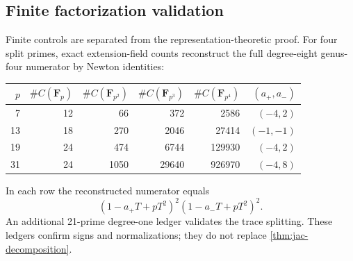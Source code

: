 \subsection{Finite factorization validation}

Finite controls are separated from the representation-theoretic proof.
For four split primes, exact extension-field counts reconstruct the full
degree-eight genus-four numerator by Newton identities:

\begin{center}
\begin{tabular}{@{}rrrrrr@{}}
\toprule
\(p\) & \(\#C(\mathbf F_p)\) & \(\#C(\mathbf F_{p^2})\) &
\(\#C(\mathbf F_{p^3})\) & \(\#C(\mathbf F_{p^4})\) &
\((a_+,a_-)\)\\
\midrule
7  & 12 & 66   & 372   & 2586   & \((-4,2)\)\\
13 & 18 & 270  & 2046  & 27414  & \((-1,-1)\)\\
19 & 24 & 474  & 6744  & 129930 & \((-4,2)\)\\
31 & 24 & 1050 & 29640 & 926970 & \((-4,8)\)\\
\bottomrule
\end{tabular}
\end{center}

In each row the reconstructed numerator equals
\[
 (1-a_+T+pT^2)^2(1-a_-T+pT^2)^2.
\]
An additional 21-prime degree-one ledger validates the trace splitting.
These ledgers confirm signs and normalizations; they do not replace
\cref{thm:jac-decomposition}.
